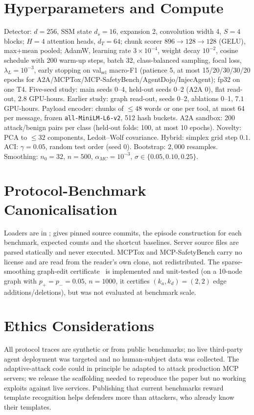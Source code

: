 \documentclass[conference,compsoc]{IEEEtran}
\begin{document}
\section{Hyperparameters and Compute}
\label{app:hyper}
Detector: $d=256$, SSM state $d_{s}=16$, expansion 2, convolution width 4, $S=4$ blocks; $H=4$ attention heads, $d_{T}=64$; chunk scorer $896\to128\to128$ (GELU), max+mean pooled; AdamW, learning rate $3\times10^{-4}$, weight decay $10^{-2}$, cosine schedule with 200 warm-up steps, batch 32, class-balanced sampling, focal loss, $\lambda_{L}=10^{-3}$, early stopping on val$_{\text{sel}}$ macro-F1 (patience 5, at most 15/20/30/30/20 epochs for A2A/MCPTox/MCP-SafetyBench/AgentDojo/InjecAgent); fp32 on one T4. Five-seed study: main seeds 0--4, held-out seeds 0--2 (A2A 0), flat read-out, $2.8$ GPU-hours. Earlier study: graph read-out, seeds 0--2, ablations 0--1, $7.1$ GPU-hours. Payload encoder: chunks of $\le48$ words or one per tool, at most 64 per message, frozen \texttt{all-MiniLM-L6-v2}, 512 hash buckets. A2A sandbox: 200 attack/benign pairs per class (held-out folds: 100, at most 10 epochs). Novelty: PCA to $\le32$ components, Ledoit--Wolf covariance. Hybrid: simplex grid step $0.1$. ACI: $\gamma=0.05$, random test order (seed 0). Bootstrap: $2{,}000$ resamples. Smoothing: $n_{0}=32$, $n=500$, $\alpha_{MC}=10^{-3}$, $\sigma\in\{0.05,0.10,0.25\}$.

\section{Protocol-Benchmark Canonicalisation}
\label{app:canon}
Loaders are in ;  gives pinned source commits, the episode construction for each benchmark, expected counts and the shortcut baselines. Server source files are parsed statically and never executed. MCPTox and MCP-SafetyBench carry no license and are read from the reader's own clone, not redistributed. The sparse-smoothing graph-edit certificate~\cite{Bojchevski2020Sparse} is implemented and unit-tested (on a 10-node graph with $p_{+}=p_{-}=0.05$, $n=1000$, it certifies $(k_{a},k_{d})=(2,2)$ edge additions/deletions), but was not evaluated at benchmark scale.

\section{Ethics Considerations}
\label{app:ethics}
All protocol traces are synthetic or from public benchmarks; no live third-party agent deployment was targeted and no human-subject data was collected. The adaptive-attack code could in principle be adapted to attack production MCP servers; we release the scaffolding needed to reproduce the paper but no working exploits against live services. Publishing that current benchmarks reward template recognition helps defenders more than attackers, who already know their templates.
\end{document}
